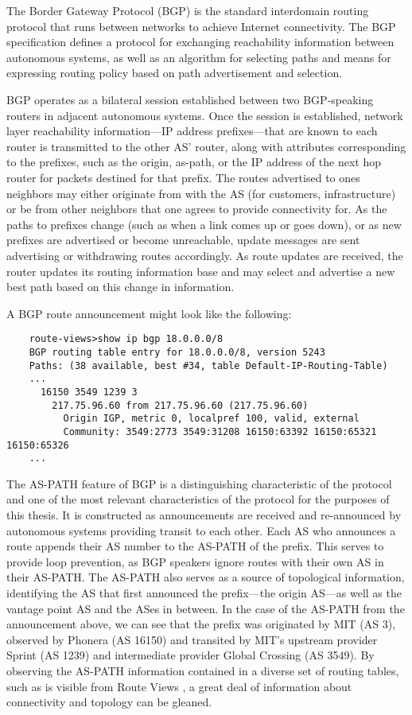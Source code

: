 The Border Gateway Protocol (BGP) is the standard interdomain routing protocol that runs between networks to achieve Internet connectivity. The BGP specification defines a protocol for exchanging reachability information between autonomous systems, as well as an algorithm for selecting paths and means for expressing routing policy based on path advertisement and selection.

BGP operates as a bilateral session established between two BGP-speaking routers in adjacent autonomous systems. Once the session is established, network layer reachability information---IP address prefixes---that are known to each router is transmitted to the other AS' router, along with attributes corresponding to the prefixes, such as the origin, as-path, or the IP address of the next hop router for packets destined for that prefix. The routes advertised to ones neighbors may either originate from with the AS (for customers, infrastructure) or be from  other neighbors that one agrees to provide connectivity for. As the paths to prefixes change (such as when a link comes up or goes down), or as new prefixes are advertised or become unreachable, update messages are sent advertising or withdrawing routes accordingly. As route updates are received, the router updates its routing information base and may select and advertise a new best path based on this change in information.

A BGP route announcement might look like the following:

\begin{verbatim}
	route-views>show ip bgp 18.0.0.0/8
	BGP routing table entry for 18.0.0.0/8, version 5243
	Paths: (38 available, best #34, table Default-IP-Routing-Table)
	...
	  16150 3549 1239 3
	    217.75.96.60 from 217.75.96.60 (217.75.96.60)
	      Origin IGP, metric 0, localpref 100, valid, external
	      Community: 3549:2773 3549:31208 16150:63392 16150:65321 16150:65326
	...
\end{verbatim}

The AS-PATH feature of BGP is a distinguishing characteristic of the protocol and one of the most relevant characteristics of the protocol for the purposes of this thesis. It is constructed as announcements are received and re-announced by autonomous systems providing transit to each other. Each AS who announces a route appends their AS number to the AS-PATH of the prefix. This serves to provide loop prevention, as BGP speakers ignore routes with their own AS in their AS-PATH. The AS-PATH also serves as a source of topological information, identifying the AS that first announced the prefix---the origin AS---as well as the vantage point AS and the ASes in between. In the case of the AS-PATH from the announcement above, we can see that the prefix was originated by MIT (AS 3), observed by Phonera (AS 16150) and transited by MIT's upstream provider Sprint (AS 1239) and intermediate provider Global Crossing (AS 3549). By observing the AS-PATH information contained in a diverse set of routing tables, such as is visible from Route Views \cite{routeviews}, a great deal of information about connectivity and topology can be gleaned.

